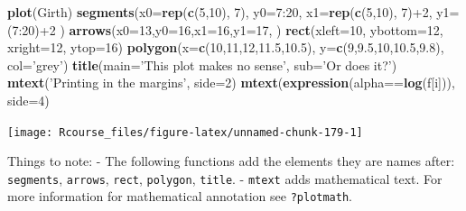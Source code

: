 \documentclass[]{book}
\newenvironment{Shaded}{\begin{snugshade}}{\end{snugshade}}
\newcommand{\KeywordTok}[1]{\textcolor[rgb]{0.13,0.29,0.53}{\textbf{{#1}}}}
\newcommand{\DataTypeTok}[1]{\textcolor[rgb]{0.13,0.29,0.53}{{#1}}}
\newcommand{\DecValTok}[1]{\textcolor[rgb]{0.00,0.00,0.81}{{#1}}}
\newcommand{\FloatTok}[1]{\textcolor[rgb]{0.00,0.00,0.81}{{#1}}}
\newcommand{\StringTok}[1]{\textcolor[rgb]{0.31,0.60,0.02}{{#1}}}
\newcommand{\NormalTok}[1]{{#1}}
\theoremstyle{definition}
\theoremstyle{definition}
\theoremstyle{remark}
\begin{document}
\begin{Shaded}
\begin{Highlighting}[]
\KeywordTok{plot}\NormalTok{(Girth)}
\KeywordTok{segments}\NormalTok{(}\DataTypeTok{x0=}\KeywordTok{rep}\NormalTok{(}\KeywordTok{c}\NormalTok{(}\DecValTok{5}\NormalTok{,}\DecValTok{10}\NormalTok{), }\DecValTok{7}\NormalTok{), }\DataTypeTok{y0=}\DecValTok{7}\NormalTok{:}\DecValTok{20}\NormalTok{, }\DataTypeTok{x1=}\KeywordTok{rep}\NormalTok{(}\KeywordTok{c}\NormalTok{(}\DecValTok{5}\NormalTok{,}\DecValTok{10}\NormalTok{), }\DecValTok{7}\NormalTok{)+}\DecValTok{2}\NormalTok{, }\DataTypeTok{y1=}\NormalTok{(}\DecValTok{7}\NormalTok{:}\DecValTok{20}\NormalTok{)+}\DecValTok{2} \NormalTok{)}
\KeywordTok{arrows}\NormalTok{(}\DataTypeTok{x0=}\DecValTok{13}\NormalTok{,}\DataTypeTok{y0=}\DecValTok{16}\NormalTok{,}\DataTypeTok{x1=}\DecValTok{16}\NormalTok{,}\DataTypeTok{y1=}\DecValTok{17}\NormalTok{, )}
\KeywordTok{rect}\NormalTok{(}\DataTypeTok{xleft=}\DecValTok{10}\NormalTok{, }\DataTypeTok{ybottom=}\DecValTok{12}\NormalTok{,  }\DataTypeTok{xright=}\DecValTok{12}\NormalTok{, }\DataTypeTok{ytop=}\DecValTok{16}\NormalTok{)}
\KeywordTok{polygon}\NormalTok{(}\DataTypeTok{x=}\KeywordTok{c}\NormalTok{(}\DecValTok{10}\NormalTok{,}\DecValTok{11}\NormalTok{,}\DecValTok{12}\NormalTok{,}\FloatTok{11.5}\NormalTok{,}\FloatTok{10.5}\NormalTok{), }\DataTypeTok{y=}\KeywordTok{c}\NormalTok{(}\DecValTok{9}\NormalTok{,}\FloatTok{9.5}\NormalTok{,}\DecValTok{10}\NormalTok{,}\FloatTok{10.5}\NormalTok{,}\FloatTok{9.8}\NormalTok{), }\DataTypeTok{col=}\StringTok{'grey'}\NormalTok{)}
\KeywordTok{title}\NormalTok{(}\DataTypeTok{main=}\StringTok{'This plot makes no sense'}\NormalTok{, }\DataTypeTok{sub=}\StringTok{'Or does it?'}\NormalTok{)}
\KeywordTok{mtext}\NormalTok{(}\StringTok{'Printing in the margins'}\NormalTok{, }\DataTypeTok{side=}\DecValTok{2}\NormalTok{)}
\KeywordTok{mtext}\NormalTok{(}\KeywordTok{expression}\NormalTok{(alpha==}\KeywordTok{log}\NormalTok{(f[i])), }\DataTypeTok{side=}\DecValTok{4}\NormalTok{)}
\end{Highlighting}
\end{Shaded}

\texttt{[image: Rcourse\_files/figure-latex/unnamed-chunk-179-1]}

Things to note: - The following functions add the elements they are
names after: \texttt{segments}, \texttt{arrows}, \texttt{rect},
\texttt{polygon}, \texttt{title}. - \texttt{mtext} adds mathematical
text. For more information for mathematical annotation see
\texttt{?plotmath}.
\end{document}

